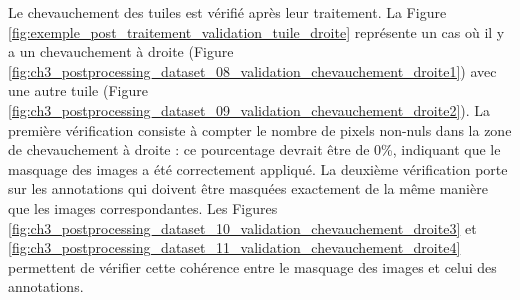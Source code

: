 Le chevauchement des tuiles est vérifié après leur traitement. La Figure \ref{fig:exemple_post_traitement_validation_tuile_droite} représente un cas où il y a un chevauchement à droite (Figure \ref{fig:ch3_postprocessing_dataset_08_validation_chevauchement_droite1}) avec une autre tuile (Figure \ref{fig:ch3_postprocessing_dataset_09_validation_chevauchement_droite2}). La première vérification consiste à compter le nombre de pixels non-nuls dans la zone de chevauchement à droite : ce pourcentage devrait être de 0\%, indiquant que le masquage des images a été correctement appliqué. La deuxième vérification porte sur les annotations qui doivent être masquées exactement de la même manière que les images correspondantes. Les Figures \ref{fig:ch3_postprocessing_dataset_10_validation_chevauchement_droite3} et \ref{fig:ch3_postprocessing_dataset_11_validation_chevauchement_droite4} permettent de vérifier cette cohérence entre le masquage des images et celui des annotations.


